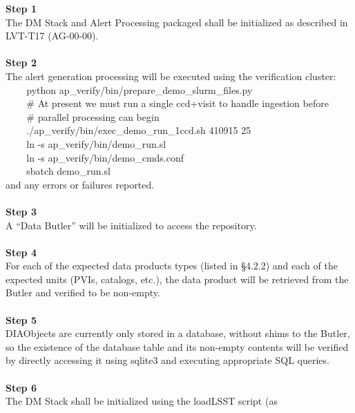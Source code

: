 \textbf{Step 1}\\
The DM Stack and Alert Processing packaged shall be initialized as
described in LVT-T17 (AG-00-00).\\
~\\
\textbf{Step 2}\\
The alert generation processing will be executed using the verification
cluster:\\
\hspace*{0.333em} ~ ~ ~python
ap\_verify/bin/prepare\_demo\_slurm\_files.py\\
\hspace*{0.333em} ~ ~ ~\# At present we must run a single ccd+visit to
handle ingestion before\\
\hspace*{0.333em} ~ ~ ~\# parallel processing can begin\\
\hspace*{0.333em} ~ ~ ~./ap\_verify/bin/exec\_demo\_run\_1ccd.sh 410915
25\\
\hspace*{0.333em} ~ ~ ~ln -s ap\_verify/bin/demo\_run.sl\\
\hspace*{0.333em} ~ ~ ~ln -s ap\_verify/bin/demo\_cmds.conf\\
\hspace*{0.333em} ~ ~ ~sbatch demo\_run.sl\\
and any errors or failures reported.\\
~\\
\textbf{Step 3}\\
A ``Data Butler'' will be initialized to access the repository.\\
~\\
\textbf{Step 4}\\
For each of the expected data products types (listed in §4.2.2) and each
of the expected units (PVIs, catalogs, etc.), the data product will be
retrieved from the Butler and verified to be non-empty.\\
~\\
\textbf{Step 5}\\
DIAObjects are currently only stored in a database, without shims to the
Butler, so the existence of the database table and its non-empty
contents will be verified by directly accessing it using sqlite3 and
executing appropriate SQL queries.\\
~\\
\textbf{Step 6}\\
The DM Stack shall be initialized using the loadLSST script (as
